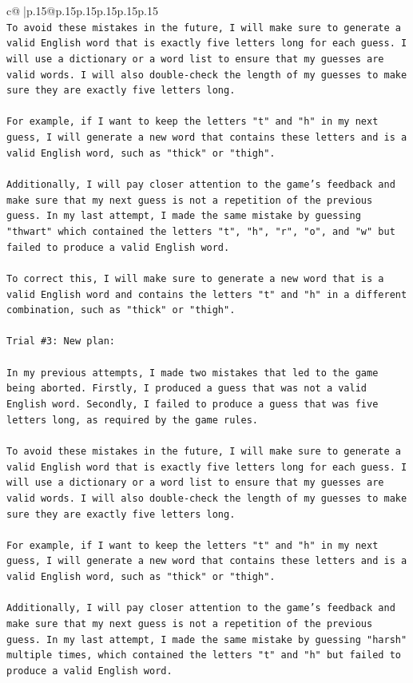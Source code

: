 \documentclass{article}
\begin{document}
{\begin{supertabular}{c@{$\;$}|p{.15\linewidth}@{}p{.15\linewidth}p{.15\linewidth}p{.15\linewidth}p{.15\linewidth}p{.15\linewidth}}
{{{\\ 
\texttt{To avoid these mistakes in the future, I will make sure to generate a valid English word that is exactly five letters long for each guess. I will use a dictionary or a word list to ensure that my guesses are valid words. I will also double{-}check the length of my guesses to make sure they are exactly five letters long. } \\
\\ 
\texttt{For example, if I want to keep the letters "t" and "h" in my next guess, I will generate a new word that contains these letters and is a valid English word, such as "thick" or "thigh".} \\
\\ 
\texttt{Additionally, I will pay closer attention to the game's feedback and make sure that my next guess is not a repetition of the previous guess. In my last attempt, I made the same mistake by guessing "thwart" which contained the letters "t", "h", "r", "o", and "w" but failed to produce a valid English word. } \\
\\ 
\texttt{To correct this, I will make sure to generate a new word that is a valid English word and contains the letters "t" and "h" in a different combination, such as "thick" or "thigh".} \\
\\ 
\texttt{Trial \#3: New plan: } \\
\\ 
\texttt{In my previous attempts, I made two mistakes that led to the game being aborted. Firstly, I produced a guess that was not a valid English word. Secondly, I failed to produce a guess that was five letters long, as required by the game rules. } \\
\\ 
\texttt{To avoid these mistakes in the future, I will make sure to generate a valid English word that is exactly five letters long for each guess. I will use a dictionary or a word list to ensure that my guesses are valid words. I will also double{-}check the length of my guesses to make sure they are exactly five letters long. } \\
\\ 
\texttt{For example, if I want to keep the letters "t" and "h" in my next guess, I will generate a new word that contains these letters and is a valid English word, such as "thick" or "thigh".} \\
\\ 
\texttt{Additionally, I will pay closer attention to the game's feedback and make sure that my next guess is not a repetition of the previous guess. In my last attempt, I made the same mistake by guessing "harsh" multiple times, which contained the letters "t" and "h" but failed to produce a valid English word. } \\
}}}
\end{supertabular}}
\end{document}
